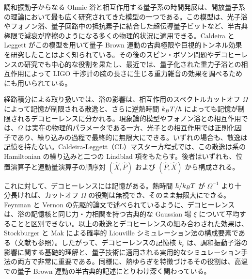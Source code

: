 調和振動子からなる Ohmic 浴と相互作用する量子系の時間発展は、開放量子系の理論において最も広く研究されてきた模型の一つである\cite{BP2002}。この模型は、光子浴やフォノン浴\cite{Wilner2015}、量子回路中の抵抗素子に結合した超伝導量子ビット\cite{Leppakangas2018}など、半古典極限で減衰が摩擦のようになる\cite{Weiss2011}多くの物理的状況に適用できる。Caldeira と Leggett がこの模型を用いて量子 Brown 運動の古典極限\cite{CaldeiraLeggettA}や巨視的トンネル効果\cite{Caldeira1981,CaldeiraLeggettB}を研究したことはよく知られている。その後のスピン・ボソン問題\cite{SpinBoson}やデコヒーレンス\cite{Unruh1989,Zurek1993,Paz1993}の研究でも中心的な役割を果たし、最近では、量子化された重力子浴との相互作用によって LIGO 干渉計の腕の長さに生じる重力雑音の効果を調べるためにも用いられている\cite{ParikhWilczekZahariade2020}。

経路積分による取り扱い\cite{Kleinert2009}では、浴の影響は、相互作用のスペクトルカットオフ $\Omega$ によって記憶が制限される散逸と、さらに逆熱時間 $k_BT/\hbar$ によっても記憶が制限されるデコヒーレンスに分かれる。現象論的模型やフォノン浴との相互作用では、$\Omega$ は実在の物理的パラメータである一方、光子との相互作用では正則化因子であり、繰り込みの過程で最終的に無限大にできる\cite{Breuer2001,Baym2009}。いずれの場合も、散逸は記憶を持たない。Caldeira-Leggett（CL）マスター方程式\cite{CaldeiraLeggettA}では、この散逸は系の Hamiltonian の繰り込みと二つの Lindblad 項をもたらす。後者はいずれも、位置演算子と運動量演算子の順序対 $(\hat X,\hat P)$ および $(\hat P,\hat X)$ から構成される。

これに対して、デコヒーレンスには記憶がある。熱時間 $\hbar/k_BT$ が $\Omega^{-1}$ より十分長ければ、カットオフ $\Omega$ の役割は無視でき、そのまま無限大にできる。Feynman と Vernon の先駆的論文\cite{FeynmanVernon}で述べられているように、デコヒーレンスは、浴の記憶核と同じ力・力相関を持つ古典的な Gaussian 場 $\xi$ について平均することと区別できない。以上の散逸とデコヒーレンスの組み合わされた効果は、Stockburger と Mak による確率的 Liouville シミュレーション法\cite{StockburgerMak1999}の構成要素である（文献\cite{Stockburger1998,Stockburger2002}も参照）。したがって、デコヒーレンスの記憶核 $k_r$ は、調和振動子浴の影響に関する基礎的理解と、量子技術に適用される実用的なシミュレーション手法の両方で非常に重要である。同様に、熱ゆらぎを特徴づけるその役割は、高温での量子 Brown 運動の半古典的記述にとりわけ深く関わっている。

